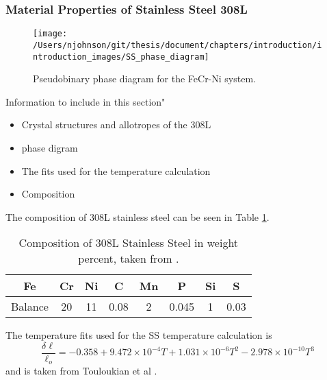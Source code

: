 \subsubsection{Material Properties of Stainless Steel 308L}

\begin{figure}
	\texttt{[image: /Users/njohnson/git/thesis/document/chapters/introduction/introduction\_images/SS\_phase\_diagram]}
	\caption{Pseudobinary phase diagram for the FeCr-Ni system.}
	\label{SS_phase_digram}
\end{figure}

Information to include in this section"
\begin{itemize}
	\item Crystal structures and allotropes of the 308L
	\item phase digram
	\item The fits used for the temperature calculation
	\item Composition
\end{itemize}

The composition of 308L stainless steel can be seen in Table \ref{SS_compo}.
\begin{table}\caption{Composition of 308L Stainless Steel in weight percent, taken from \cite{SSMatweb}.}\label{SS_compo}
	\begin{center}
		\begin{tabular}{cccccccc} \hline
		Fe & Cr & Ni & C & Mn & P & Si & S  \\ \hline
		Balance & 20 & 11 & 0.08 & 2 & 0.045 & 1 & 0.03 \\
		\end{tabular}
	\end{center}
\end{table}

The temperature fits used for the SS temperature calculation is
\begin{equation}
	\frac{\delta \ell}{\ell_o} = -0.358 + 9.472\times10^{-4}T + 1.031\times10^{-6}T^2 - 2.978\times10^{-10}T^3
	\label{SS_temperature_calculation}
\end{equation}
and is taken from Touloukian et al \cite{Touloukian1975}.